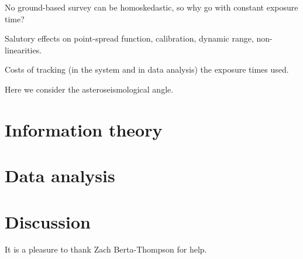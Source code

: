 \documentclass[12pt, preprint]{aastex}
\begin{document}
No ground-based survey can be homoskedastic, so why go with constant exposure time?

Salutory effects on point-spread function, calibration, dynamic range, non-linearities.

Costs of tracking (in the system and in data analysis) the exposure times used.

Here we consider the asteroseismological angle.

\section{Information theory}

\section{Data analysis}

\section{Discussion}

\acknowledgements
It is a pleasure to thank Zach Berta-Thompson for help.
\end{document}
